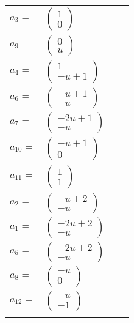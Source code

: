 \documentclass[1p]{elsarticle_modified}
\theoremstyle{definition}
\begin{document}
\begin{tabular}{m{7pt} m{180pt} m{7pt} m{180pt} }
\flushright $a_{3}=$&$\begin{pmatrix}1\\0\end{pmatrix}$ \\
\flushright $a_{9}=$&$\begin{pmatrix}0\\u\end{pmatrix}$ \\
\flushright $a_{4}=$&$\begin{pmatrix}1\\- u+1\end{pmatrix}$ \\
\flushright $a_{6}=$&$\begin{pmatrix}- u+1\\- u\end{pmatrix}$ \\
\flushright $a_{7}=$&$\begin{pmatrix}-2 u+1\\- u\end{pmatrix}$ \\
\flushright $a_{10}=$&$\begin{pmatrix}- u+1\\0\end{pmatrix}$ \\
\flushright $a_{11}=$&$\begin{pmatrix}1\\1\end{pmatrix}$ \\
\flushright $a_{2}=$&$\begin{pmatrix}- u+2\\- u\end{pmatrix}$ \\
\flushright $a_{1}=$&$\begin{pmatrix}-2 u+2\\- u\end{pmatrix}$ \\
\flushright $a_{5}=$&$\begin{pmatrix}-2 u+2\\- u\end{pmatrix}$ \\
\flushright $a_{8}=$&$\begin{pmatrix}- u\\0\end{pmatrix}$ \\
\flushright $a_{12}=$&$\begin{pmatrix}- u\\-1\end{pmatrix}$\\&\end{tabular}
\end{document}
